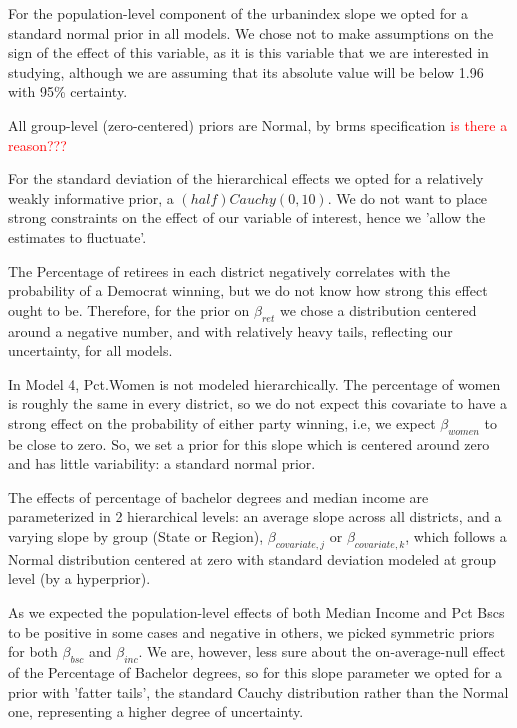 \documentclass[12pt]{article}
\begin{document}
For the population-level component of the urbanindex slope we opted for a standard normal prior in all models. We chose not to make assumptions on the sign of the effect of this variable, as it is this variable that we are interested in studying, although we are assuming that its absolute value will be below 1.96 with 95\% certainty. 

All group-level (zero-centered) priors are Normal, by brms specification \textcolor{red}{is there a reason???}

For the standard deviation of the hierarchical effects we opted for a relatively weakly informative prior, a $(half)Cauchy(0,10)$.
We do not want to place strong constraints on the effect of our variable of interest, hence we 'allow the estimates to fluctuate'.



The Percentage of retirees in each district negatively correlates with the probability of a Democrat winning, but we do not know how strong this effect ought to be. Therefore, for the prior on $\beta_{ret}$ we chose a distribution centered around a negative number, and with relatively heavy tails, reflecting our uncertainty, for all models. 



In Model 4, Pct.Women is not modeled hierarchically.
The percentage of women is roughly the same in every district, so we do not expect this covariate to have a strong effect on the probability of either party winning, i.e, we expect $\beta_{women}$ to be close to zero. So, we set a prior for this slope which is centered around zero and has little variability: a standard normal prior. 



The effects of percentage of bachelor degrees and median income are parameterized in 2 hierarchical levels: an average slope across all districts, and a varying slope by group (State or Region), $\beta_{covariate,j}$ or $\beta_{covariate,k}$, which follows a Normal distribution centered at zero with standard deviation modeled at group level (by a hyperprior).

 

As we expected the population-level effects of both Median Income and Pct Bscs to be positive in some cases and negative in others, we picked symmetric priors for both $\beta_{bsc}$ and $\beta_{inc}$. We are, however, less sure about the on-average-null effect of the Percentage of Bachelor degrees, so for this slope parameter we opted for a prior with 'fatter tails', the standard Cauchy distribution rather than the Normal one, representing a higher degree of uncertainty.
\end{document}
